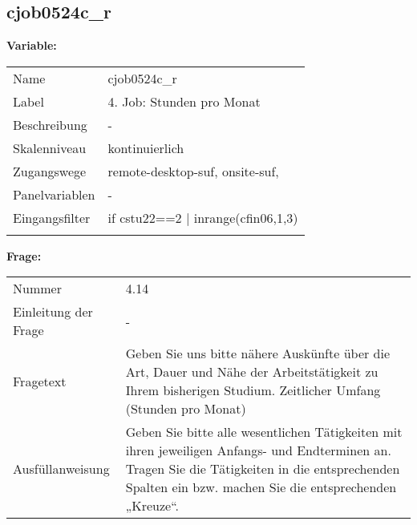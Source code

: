 	
	
	\subsection{cjob0524c\_r}
	\label{subSection:cjob0524c_r}

	\noindent\textbf{Variable:}\\
		\begin{tabular}{lL{11.3cm}}
			\label{tableVariable:cjob0524c_r}
			Name & cjob0524c\_r \\
			Label & 4. Job: Stunden pro Monat \\
			Beschreibung & - \\
			Skalenniveau & kontinuierlich \\
			Zugangswege &
				remote-desktop-suf,
				onsite-suf,
 \\
			Panelvariablen & -
			 \\
			Eingangsfilter & if cstu22==2 | inrange(cfin06,1,3) \\
 \\
		\end{tabular}

		\vspace*{1 cm}
		\noindent\textbf{Frage:}\\
		\begin{tabular}{lL{11.3cm}}
			\label{tableQuestion:cjob0524c_r}
			Nummer & 4.14 \\
			Einleitung der Frage & - \\
			Fragetext & Geben Sie uns bitte nähere Auskünfte über die Art, Dauer und Nähe der Arbeitstätigkeit zu Ihrem bisherigen Studium.
Zeitlicher Umfang
(Stunden pro Monat) \\
			Ausfüllanweisung & Geben Sie bitte alle wesentlichen Tätigkeiten mit ihren jeweiligen Anfangs- und Endterminen an. Tragen Sie die Tätigkeiten in die entsprechenden Spalten ein bzw. machen Sie die entsprechenden „Kreuze“. \\
		\end{tabular}




